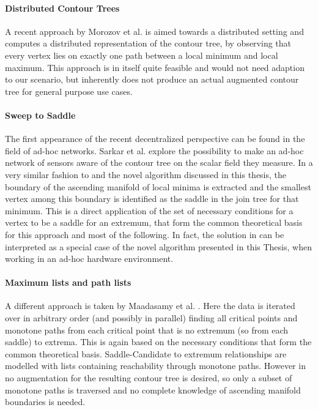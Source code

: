 \documentclass{scrartcl}
\begin{document}
\paragraph{Distributed Contour Trees}
A recent approach by Morozov et al. \cite{Morozov} is aimed towards a distributed setting and computes a distributed representation of the contour tree, by observing that every vertex lies on exactly one path between a local minimum and local maximum. This approach is in itself quite feasible and would not need adaption to our scenario, but inherently does not produce an actual augmented contour tree for general purpose use cases.

\paragraph{Sweep to Saddle}
The first appearance of the recent decentralized perspective \cite{base} can be found in the field of ad-hoc networks. Sarkar et al. \cite{adhoc} explore the possibility to make an ad-hoc network of sensors aware of the contour tree on the scalar field they measure. In a very similar fashion to \cite{Carr} and the novel algorithm discussed in this thesis, the boundary of the ascending manifold of local minima is extracted and the smallest vertex among this boundary is identified as the saddle in the join tree for that minimum. This is a direct application of the set of necessary conditions for a vertex to be a saddle for an extremum, that form the common theoretical basis for this approach and most of the following. In fact, the solution in \cite{adhoc} can be interpreted as a special case of the novel algorithm presented in this Thesis, when working in an ad-hoc hardware environment.

\paragraph{Maximum lists and path lists}
A different approach is taken by Maadasamy et al. \cite{Maadasamy}. Here the data is iterated over in arbitrary order (and possibly in parallel) finding all critical points and monotone paths from each critical point that is no extremum (so from each saddle) to extrema. This is again based on the necessary conditions that form the common theoretical basis. Saddle-Candidate to extremum relationships are modelled with lists containing reachability through monotone paths. However in \cite{Maadasamy} no augmentation for the resulting contour tree is desired, so only a subset of monotone paths is traversed and no complete knowledge of ascending manifold boundaries is needed.
\end{document}
